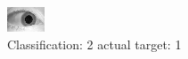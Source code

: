 \begin{figure}[h!]
\begin{center}
\includegraphics[width=0.60\columnwidth]{figures/ID1492_class_2_target_1.png}
\end{center}
\caption{ Classification: 2 actual target: 1}
\label{fig:ID1492_class_2_target_1}
\end{figure}
